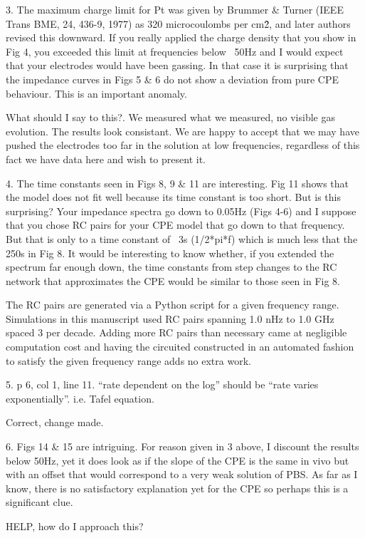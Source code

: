 \documentclass[journal, a4paper]{IEEEtran}
\begin{document}
{    3. The maximum charge limit for Pt was given by Brummer \& Turner (IEEE Trans BME, 24, 436-9, 1977) as 320 microcoulombs per cm\^2, and later authors revised this downward. If you really applied the charge density that you show in Fig 4, you exceeded this limit at frequencies below ~50Hz and I would expect that your electrodes would have been gassing. In that case it is surprising that the impedance curves in Figs 5 \& 6 do not show a deviation from pure CPE behaviour. This is an important anomaly.

    {
        \color{red}
        What should I say to this?. We measured what we measured, no visible gas evolution. The results look consistant. We are happy to accept that we may have pushed the electrodes too far in the solution at low frequencies, regardless of this fact we have data here and wish to present it.
    }

    4. The time constants seen in Figs 8, 9 \& 11 are interesting. Fig 11 shows that the model does not fit well because its time constant is too short. But is this surprising? Your impedance spectra go down to 0.05Hz (Figs 4-6) and I suppose that you chose RC pairs for your CPE model that go down to that frequency. But that is only to a time constant of ~3s (1/2*pi*f) which is much less that the 250s in Fig 8. It would be interesting to know whether, if you extended the spectrum far enough down, the time constants from step changes to the RC network that approximates the CPE would be similar to those seen in Fig 8.

    {
        \color{blue}
        The RC pairs are generated via a Python script for a given frequency range. Simulations in this manuscript used RC pairs spanning 1.0 nHz to 1.0 GHz spaced 3 per decade. Adding more RC pairs than necessary came at negligible computation cost and having the circuited constructed in an automated fashion to satisfy the given frequency range adds no extra work.
    }

    5. p 6, col 1, line 11. ``rate dependent on the log'' should be ``rate varies exponentially''. i.e. Tafel equation.

    {
        \color{blue}
        Correct, change made.
    }

    6. Figs 14 \& 15 are intriguing. For reason given in 3 above, I discount the results below 50Hz, yet it does look as if the slope of the CPE is the same in vivo but with an offset that would correspond to a very weak solution of PBS. As far as I know, there is no satisfactory explanation yet for the CPE so perhaps this is a significant clue.

   {
       \color{red}
       HELP, how do I approach this?
   }

}
\end{document}
